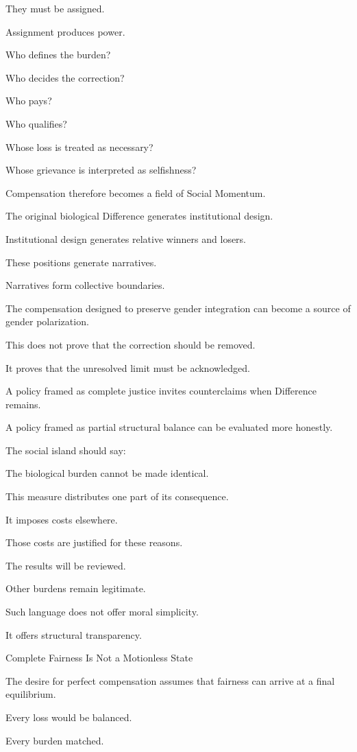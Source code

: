 They must be assigned.

Assignment produces power.

Who defines the burden?

Who decides the correction?

Who pays?

Who qualifies?

Whose loss is treated as necessary?

Whose grievance is interpreted as selfishness?

Compensation therefore becomes a field of Social Momentum.

The original biological Difference generates institutional design.

Institutional design generates relative winners and losers.

These positions generate narratives.

Narratives form collective boundaries.

The compensation designed to preserve gender integration can become a source of gender polarization.

This does not prove that the correction should be removed.

It proves that the unresolved limit must be acknowledged.

A policy framed as complete justice invites counterclaims when Difference remains.

A policy framed as partial structural balance can be evaluated more honestly.

The social island should say:

The biological burden cannot be made identical.

This measure distributes one part of its consequence.

It imposes costs elsewhere.

Those costs are justified for these reasons.

The results will be reviewed.

Other burdens remain legitimate.

Such language does not offer moral simplicity.

It offers structural transparency.

Complete Fairness Is Not a Motionless State

The desire for perfect compensation assumes that fairness can arrive at a final equilibrium.

Every loss would be balanced.

Every burden matched.

